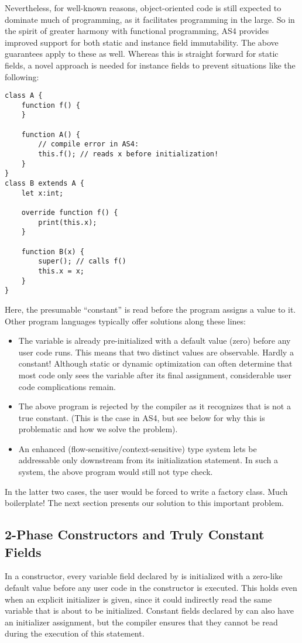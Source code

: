 Nevertheless, for well-known reasons, object-oriented code is still
expected to dominate much of programming, as it facilitates programming in the
large. So in the spirit of greater harmony with functional programming,
AS4 provides improved support for both static and instance field immutability.
The above guarantees apply to these as well. Whereas this is straight forward
for static fields, a novel approach is needed for instance fields to prevent
situations like the following:

\begin{verbatim}
class A {
    function f() {
    }

    function A() {
        // compile error in AS4:
        this.f(); // reads x before initialization!
    }
}
class B extends A {
    let x:int;

    override function f() {
        print(this.x);
    }

    function B(x) {
        super(); // calls f()
        this.x = x;
    }
}
\end{verbatim}
Here, the presumable ``constant''  is read before the program assigns a
value to it. Other program languages typically offer solutions along these
lines:
\begin{itemize}
  \item The variable  is already pre-initialized with a default value
  (zero) before any user code runs. This means that two distinct values are observable.
  Hardly a constant! Although static or dynamic optimization can often determine
  that most code only sees the variable after its final assignment, considerable user
  code complications remain.
  \item The above program is rejected by the compiler as it recognizes that
         is not a true constant. (This is the case in AS4, but
        see below for why this is problematic and how we solve the problem).
  \item An enhanced (flow-sensitive/context-sensitive) type system lets 
    be addressable only downstream from its
  initialization statement. In such a system, the above program would still not
  type check.
\end{itemize}
In the latter two cases, the user would be forced to write a factory class. Much
boilerplate! The next section presents our solution to this
important problem.


\subsection{2-Phase Constructors and Truly Constant Fields}
\label{construct2}
In a constructor, every variable field declared by  is initialized
with a zero-like default value before any user code in the constructor is
executed. This holds even when an explicit initializer is given, since it could
indirectly read the same variable that is about to be initialized.
Constant fields declared by  can also have an initializer assignment,
but the compiler ensures that they cannot be read during the execution of this
statement.

